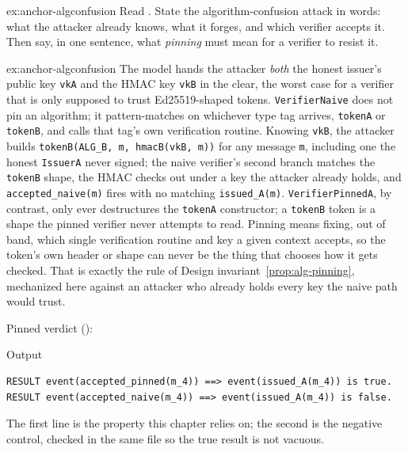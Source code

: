 \documentclass[11pt,a4paper]{article}
\theoremstyle{definition}
\begin{document}

\begin{pdexercise}[kind=Trace,rating=2]{ex:anchor-algconfusion}
Read . State the algorithm-confusion attack in words: what the attacker already knows, what it forges, and which verifier accepts it. Then say, in one sentence, what \emph{pinning} must mean for a verifier to resist it.
\end{pdexercise}
\begin{pdsolution}{ex:anchor-algconfusion}
The model hands the attacker \emph{both} the honest issuer's public key \texttt{vkA} and the HMAC key \texttt{vkB} in the clear, the worst case for a verifier that is only supposed to trust Ed25519-shaped tokens. \texttt{VerifierNaive} does not pin an algorithm; it pattern-matches on whichever type tag arrives, \texttt{tokenA} or \texttt{tokenB}, and calls that tag's own verification routine. Knowing \texttt{vkB}, the attacker builds \texttt{tokenB(ALG\_B, m, hmacB(vkB, m))} for any message \texttt{m}, including one the honest \texttt{IssuerA} never signed; the naive verifier's second branch matches the \texttt{tokenB} shape, the HMAC checks out under a key the attacker already holds, and \texttt{accepted\_naive(m)} fires with no matching \texttt{issued\_A(m)}. \texttt{VerifierPinnedA}, by contrast, only ever destructures the \texttt{tokenA} constructor; a \texttt{tokenB} token is a shape the pinned verifier never attempts to read. Pinning means fixing, out of band, which single verification routine and key a given context accepts, so the token's own header or shape can never be the thing that chooses how it gets checked. That is exactly the rule of Design invariant~\ref{prop:alg-pinning}, mechanized here against an attacker who already holds every key the naive path would trust.

Pinned verdict ():
\begin{pdlisting}{Output}{}
\begin{lstlisting}[style=pdoutput]
RESULT event(accepted_pinned(m_4)) ==> event(issued_A(m_4)) is true.
RESULT event(accepted_naive(m_4)) ==> event(issued_A(m_4)) is false.
\end{lstlisting}
\end{pdlisting}
The first line is the property this chapter relies on; the second is the negative control, checked in the same file so the true result is not vacuous.
\end{pdsolution}
\end{document}
